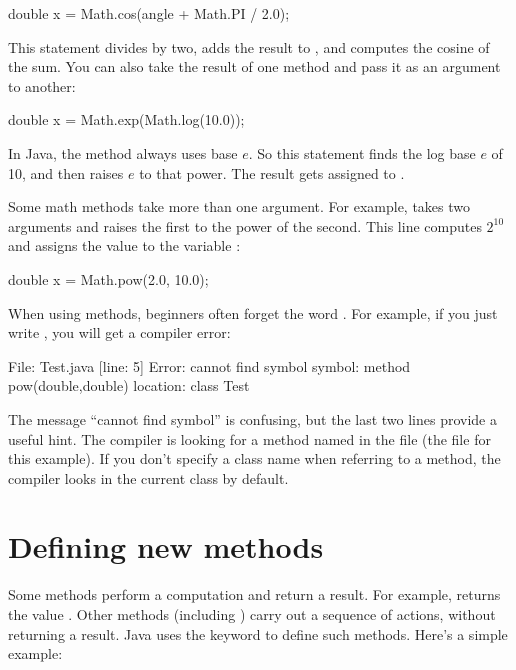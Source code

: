\begin{code}
double x = Math.cos(angle + Math.PI / 2.0);
\end{code}

This statement divides  by two, adds the result to , and computes the cosine of the sum.
You can also take the result of one method and pass it as an argument to another:

\begin{code}
double x = Math.exp(Math.log(10.0));
\end{code}

In Java, the  method always uses base $e$.
So this statement finds the log base $e$ of 10, and then raises $e$ to that power.
The result gets assigned to .

Some math methods take more than one argument.
For example,  takes two arguments and raises the first to the power of the second.
This line computes $2^{10}$ and assigns the value  to the variable :

\begin{code}
double x = Math.pow(2.0, 10.0);
\end{code}

When using  methods, beginners often forget the word .
For example, if you just write , you will get a compiler error:

\begin{stdout}
File: Test.java  [line: 5]
Error: cannot find symbol
  symbol:   method pow(double,double)
  location: class Test
\end{stdout}

The message ``cannot find symbol'' is confusing, but the last two lines provide a useful hint.
The compiler is looking for a method named  in the file  (the file for this example).
If you don't specify a class name when referring to a method, the compiler looks in the current class by default.


\section{Defining new methods}
\label{adding_methods}



Some methods perform a computation and return a result.
For example,  returns the value .
Other methods (including ) carry out a sequence of actions, without returning a result.
Java uses the keyword  to define such methods.
Here's a simple example:

